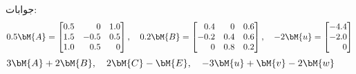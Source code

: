 جوابات:
\begin{align*}
0.5\bM{A}=
\begin{bmatrix*}[r]
0.5&0&1.0\\
1.5&-0.5&0.5\\
1.0&0.5&0
\end{bmatrix*},\quad
0.2\bM{B}=
\begin{bmatrix*}[r]
0.4&0&0.6\\
-0.2&0.4&0.6\\
0&0.8&0.2
\end{bmatrix*},\quad
-2\bM{u}=
\begin{bmatrix*}[r]
-4.4\\
-2.0\\
0
\end{bmatrix*}
\end{align*}
\quad
$3\bM{A}+2\bM{B},\quad 2\bM{C}-\bM{E},\quad -3\bM{u}+\bM{v}-2\bM{w}$\\

